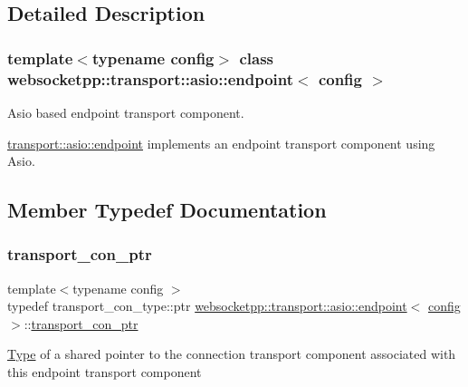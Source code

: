 \subsection{Detailed Description}
\subsubsection*{template$<$typename config$>$\newline
class websocketpp\+::transport\+::asio\+::endpoint$<$ config $>$}

Asio based endpoint transport component. 

\mbox{\hyperlink{classwebsocketpp_1_1transport_1_1asio_1_1endpoint}{transport\+::asio\+::endpoint}} implements an endpoint transport component using Asio. 

\subsection{Member Typedef Documentation}
\mbox{\label{classwebsocketpp_1_1transport_1_1asio_1_1endpoint_ac5fc306f32d15f92dd1b22366eaba62d}} 
\subsubsection{\texorpdfstring{transport\+\_\+con\+\_\+ptr}{transport\_con\_ptr}}
{\footnotesize\ttfamily template$<$typename config $>$ \\
typedef transport\+\_\+con\+\_\+type\+::ptr \mbox{\hyperlink{classwebsocketpp_1_1transport_1_1asio_1_1endpoint}{websocketpp\+::transport\+::asio\+::endpoint}}$<$ \mbox{\hyperlink{classconfig}{config}} $>$\+::\mbox{\hyperlink{classwebsocketpp_1_1transport_1_1asio_1_1endpoint_ac5fc306f32d15f92dd1b22366eaba62d}{transport\+\_\+con\+\_\+ptr}}}

\mbox{\hyperlink{struct_type}{Type}} of a shared pointer to the connection transport component associated with this endpoint transport component \mbox{\label{classwebsocketpp_1_1transport_1_1asio_1_1endpoint_a75f3102766fd3ba8230e99a2b0e00457}} 
